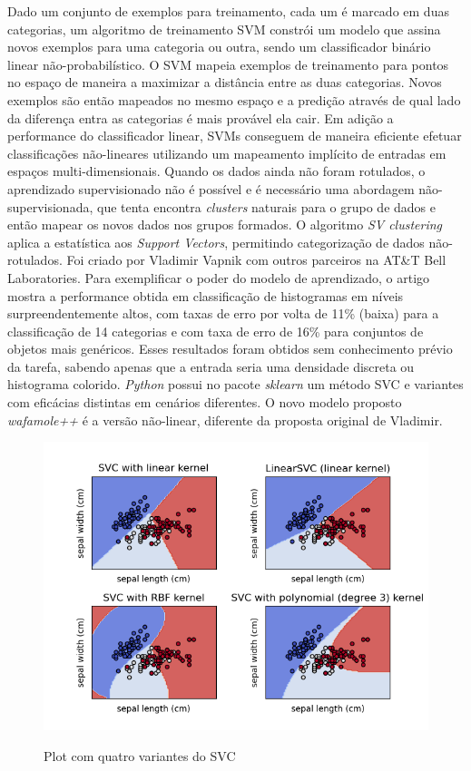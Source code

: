 Dado um conjunto de exemplos para treinamento, cada um é marcado em duas categorias, um algoritmo de treinamento SVM constrói um modelo que assina novos exemplos para uma categoria ou outra, sendo um classificador binário linear não-probabilístico. 
O SVM mapeia exemplos de treinamento para pontos no espaço de maneira a maximizar a distância entre as duas categorias. Novos exemplos são então mapeados no mesmo espaço e a predição através de qual lado da diferença entra as categorias é mais provável ela cair. Em adição a performance do classificador linear, SVMs conseguem de maneira eficiente efetuar classificações não-lineares utilizando um mapeamento implícito de entradas em espaços multi-dimensionais.
Quando os dados ainda não foram rotulados, o aprendizado supervisionado não é possível e é necessário uma abordagem não-supervisionada, que tenta encontra \textit{clusters} naturais para o grupo de dados e então mapear os novos dados nos grupos formados. O algoritmo \textit{SV clustering} aplica a estatística aos \textit{Support Vectors}, permitindo categorização de dados não-rotulados.
Foi criado por Vladimir Vapnik com outros parceiros na AT\&T Bell Laboratories.
Para exemplificar o poder do modelo de aprendizado, o artigo \cite{vapnik_svm_support} mostra a performance obtida em classificação de histogramas em níveis surpreendentemente altos, com taxas de erro por volta de 11\% (baixa) para a classificação de 14 categorias e com taxa de erro de 16\% para conjuntos de objetos mais genéricos. Esses resultados foram obtidos sem conhecimento prévio da tarefa, sabendo apenas que a entrada seria uma densidade discreta ou histograma colorido.
\textit{Python} possui no pacote \textit{sklearn} um método SVC e variantes com eficácias distintas em cenários diferentes.
O novo modelo proposto \textit{wafamole++} é a versão não-linear, diferente da proposta original de Vladimir.

\begin{figure}[ht]
    \centering
    \caption{Plot com quatro variantes do SVC}
    \includegraphics[width=14cm]{figuras/plot-svc.png} 
    \label{fig:internet} 
\end{figure}

